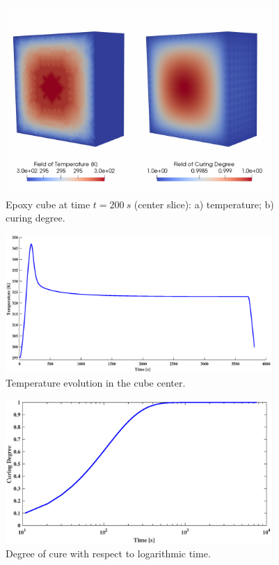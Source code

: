\begin{figure}[h!]
	\centering
	\includegraphics[width=0.9\textwidth]{obrazky/curing_temperature_t200.jpg}
	\caption[Epoxy cube]{Epoxy cube at time $t=200~s$ (center slice): a) temperature; b) curing degree.}\label{obr:Curing_cube}
\end{figure}



\begin{figure}[h!]
	\centering
	\includegraphics[width=0.9\textwidth]{obrazky/T-t.eps}
	\caption[Temperature evolution]{Temperature evolution in the cube center.}\label{obr:Curing_temperature}
\end{figure}

\begin{figure}[h!]
	\centering
	\includegraphics[width=0.9\textwidth]{obrazky/CD-t.eps}
	\caption[Degree of cure with respect to time]{Degree of cure with respect to logarithmic time.}\label{obr:Curing_curing}
\end{figure}

